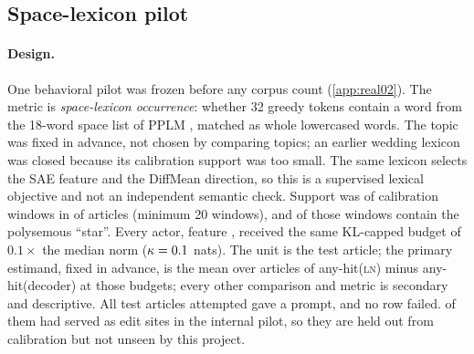 \documentclass{article}
\theoremstyle{plain}
\theoremstyle{definition}
\theoremstyle{remark}
\newcommand{\LN}{\textsc{ln}}
\begin{document}
\subsection{Space-lexicon pilot}
\label{sec:real02}
\paragraph{Design.} One behavioral pilot was frozen before any corpus count
(\cref{app:real02}). The metric is \emph{space-lexicon occurrence}: whether 32 greedy tokens
contain a word from the 18-word space list of PPLM \citep{dathathri2020plug}, matched as whole
lowercased words. The topic was fixed in advance, not chosen by comparing topics; an
earlier wedding lexicon was closed because its calibration support was too small. The same
lexicon selects the SAE feature and the DiffMean direction, so this is a supervised lexical
objective and not an independent semantic check. Support was \SpPosWin{} of \SpWin{}
calibration windows in \SpPosDocs{} of \SpCalDocs{} articles (minimum 20 windows), and
\SpStarWin{} of those windows contain the polysemous ``star''. Every actor, feature
\SpFeature{}, received the same KL-capped budget of $0.1\times$ the median norm
($\kappa = 0.1$ nats). The unit is the test article; the primary estimand, fixed in
advance, is the mean over articles of any-hit(\LN) minus any-hit(decoder) at those budgets;
every other comparison and metric is secondary and descriptive. All \SpAttempted{} test articles attempted gave a prompt, and no
row failed. \SpOverlapPilot{} of them had served as edit sites in the internal pilot, so they
are held out from calibration but not unseen by this project.
\end{document}
